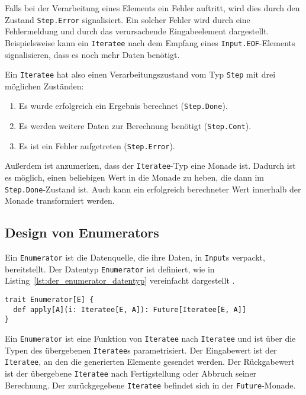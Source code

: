 Falls bei der Verarbeitung eines Elements ein Fehler auftritt, wird dies durch den Zustand \lstinline|Step.Error| signalisiert.
Ein solcher Fehler wird durch eine Fehlermeldung und durch das verursachende Eingabeelement dargestellt.
Beispielsweise kann ein \lstinline|Iteratee| nach dem Empfang eines \lstinline|Input.EOF|-Elements signalisieren, dass es noch mehr Daten benötigt.

Ein \lstinline|Iteratee| hat also einen Verarbeitungszustand vom Typ \lstinline|Step| mit drei möglichen Zuständen:
\begin{enumerate}
  \item Es wurde erfolgreich ein Ergebnis berechnet (\lstinline|Step.Done|).
  \item Es werden weitere Daten zur Berechnung benötigt (\lstinline|Step.Cont|).
  \item Es ist ein Fehler aufgetreten (\lstinline|Step.Error|).
\end{enumerate}

Außerdem ist anzumerken, dass der \lstinline|Iteratee|-Typ eine Monade ist.
Dadurch ist es möglich, einen beliebigen Wert in die Monade zu heben, die dann im \lstinline|Step.Done|-Zustand ist.
Auch kann ein erfolgreich berechneter Wert innerhalb der Monade transformiert werden.



\subsection{Design von Enumerators} %
\label{sub:design_enumerators}

Ein \lstinline|Enumerator| ist die Datenquelle, die ihre Daten, in \lstinline|Input|s verpackt, bereitstellt.
Der Datentyp \lstinline|Enumerator| ist definiert, wie in Listing~\ref{lst:der_enumerator_datentyp} vereinfacht dargestellt \cite[vgl.][]{play_enumerator_source_code}.
\begin{lstlisting}[caption=Der Enumerator-Datentyp, label=lst:der_enumerator_datentyp]
trait Enumerator[E] {
  def apply[A](i: Iteratee[E, A]): Future[Iteratee[E, A]]
}
\end{lstlisting}

Ein \lstinline|Enumerator| ist eine Funktion von \lstinline|Iteratee| nach \lstinline|Iteratee| und ist über die Typen des übergebenen \lstinline|Iteratee|s parametrisiert.
Der Eingabewert ist der \lstinline|Iteratee|, an den die generierten Elemente gesendet werden.
Der Rückgabewert ist der übergebene \lstinline|Iteratee| nach Fertigstellung oder Abbruch seiner Berechnung.
Der zurückgegebene \lstinline|Iteratee| befindet sich in der \lstinline|Future|-Monade.

